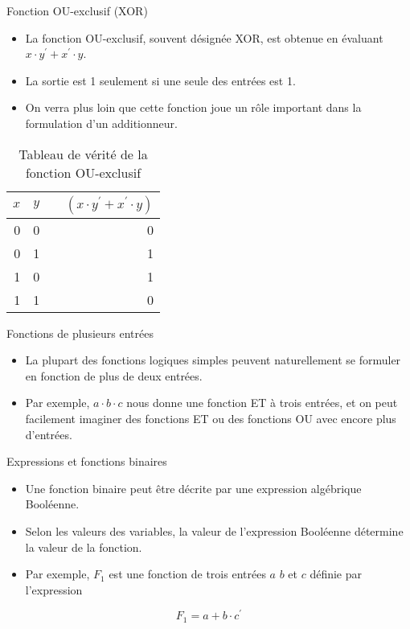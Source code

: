 \documentclass[presentation]{beamer}
\begin{document}
\begin{frame}[label={sec:orgfdba10e}]{Fonction OU-exclusif (XOR)}
\begin{itemize}
\item La fonction OU-exclusif, souvent désignée XOR, est obtenue en évaluant \(x \cdot y^\prime + x^\prime \cdot y\).

\item La sortie est 1 seulement si une seule des entrées est 1.

\item On verra plus loin que cette fonction joue un rôle important dans la formulation d'un additionneur.
\end{itemize}

\begin{table}[htbp]
\caption{\label{tab:orgd7d98cc}Tableau de vérité de la fonction OU-exclusif}
\centering
\begin{tabular}{rrlr}
\(x\) & \(y\) &  & \((x \cdot y^\prime + x^\prime \cdot y)\)\\
\hline
0 & 0 &  & 0\\
0 & 1 &  & 1\\
1 & 0 &  & 1\\
1 & 1 &  & 0\\
\end{tabular}
\end{table}
\end{frame}

\begin{frame}[label={sec:orgd0f89ad}]{Fonctions de plusieurs entrées}
\begin{itemize}
\item La plupart des fonctions logiques simples peuvent naturellement se formuler en fonction de plus de deux entrées.

\item Par exemple, \(a \cdot b \cdot c\) nous donne une fonction ET à trois entrées, et on peut facilement imaginer des fonctions ET ou des fonctions OU avec encore plus d'entrées.
\end{itemize}
\end{frame}

\begin{frame}[label={sec:org86a0d12}]{Expressions et fonctions binaires}
\begin{itemize}
\item Une fonction binaire peut être décrite par une expression algébrique Booléenne.

\item Selon les valeurs des variables, la valeur de l'expression Booléenne détermine la valeur de la fonction.

\item Par exemple, \(F_1\) est une fonction de trois entrées \(a\) \(b\) et \(c\) définie par l'expression
\end{itemize}

$$ F_1 = a + b \cdot c^\prime $$
\end{frame}
\end{document}
